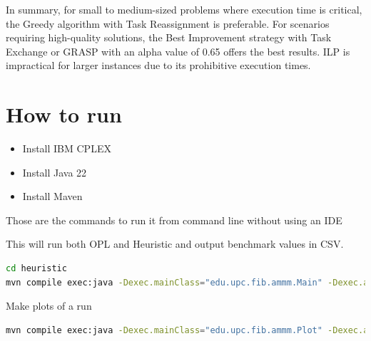 \documentclass{article}
\begin{document}
In summary, for small to medium-sized problems where execution time is critical, the Greedy algorithm with Task Reassignment is preferable. For scenarios requiring high-quality solutions, the Best Improvement strategy with Task Exchange or GRASP with an alpha value of 0.65 offers the best results. ILP is impractical for larger instances due to its prohibitive execution times.


\section{How to run}

\begin{itemize}
  \item Install IBM CPLEX
  \item Install Java 22
  \item Install Maven
\end{itemize}

Those are the commands to run it from command line without using an IDE

This will run both OPL and Heuristic and output benchmark values in CSV.

\begin{lstlisting}[language=bash]
cd heuristic
mvn compile exec:java -Dexec.mainClass="edu.upc.fib.ammm.Main" -Dexec.args="../opl"
\end{lstlisting}

Make plots of a run

\begin{lstlisting}[language=bash]
mvn compile exec:java -Dexec.mainClass="edu.upc.fib.ammm.Plot" -Dexec.args="output.csv"
\end{lstlisting}
\end{document}

